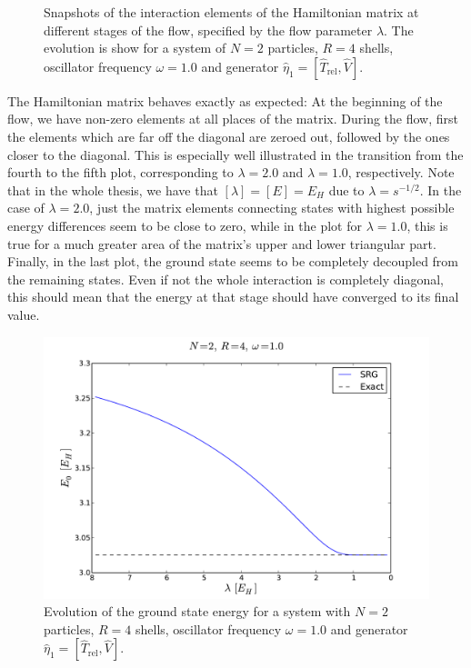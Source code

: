 \begin{figure}
{}
\caption{Snapshots of the interaction elements of the  Hamiltonian matrix at different stages of the flow, specified by the flow parameter $\lambda$. The evolution is show for a system of $N=2$ particles, $R = 4$ shells, oscillator frequency $\omega=1.0$ and generator $\hat{\eta}_1 = [\hat{T}_{\text{rel}},\hat{V}]$.}
\label{fig:HamilFlow}
\end{figure}

The Hamiltonian matrix behaves exactly as expected: At the beginning of the flow, we have non-zero elements at all places of the matrix. During the flow, first the elements which are far off the diagonal are zeroed out, followed by the ones closer to the diagonal. This is especially well illustrated in the transition from the fourth to the fifth plot, corresponding to $\lambda = 2.0$ and $\lambda = 1.0$, respectively. Note that in the whole thesis, we have that $\left[ \lambda \right] = \left[E\right ] = E_H$ due to $\lambda = s^{-1/2}$. In the case of $\lambda = 2.0$, just the matrix elements connecting states with highest possible energy differences seem to be close to zero, while in the plot for $\lambda = 1.0$, this is true for a much greater area of the matrix's upper and lower triangular part. Finally, in the last plot, the ground state seems to be completely decoupled from the remaining states. Even if not the whole interaction is completely diagonal, this should mean that the energy at that stage should have converged to its final value.\\
\begin{figure}
\begin{center}
\includegraphics[scale=0.4]{../Plots/energy1.pdf}
\end{center}
\caption{Evolution of the ground state energy for a system with $N=2$ particles, $R = 4$ shells, oscillator frequency $\omega=1.0$ and generator $\hat{\eta}_1 = [\hat{T}_{\text{rel}},\hat{V}]$.}
\label{fig:energy1}
\end{figure}
